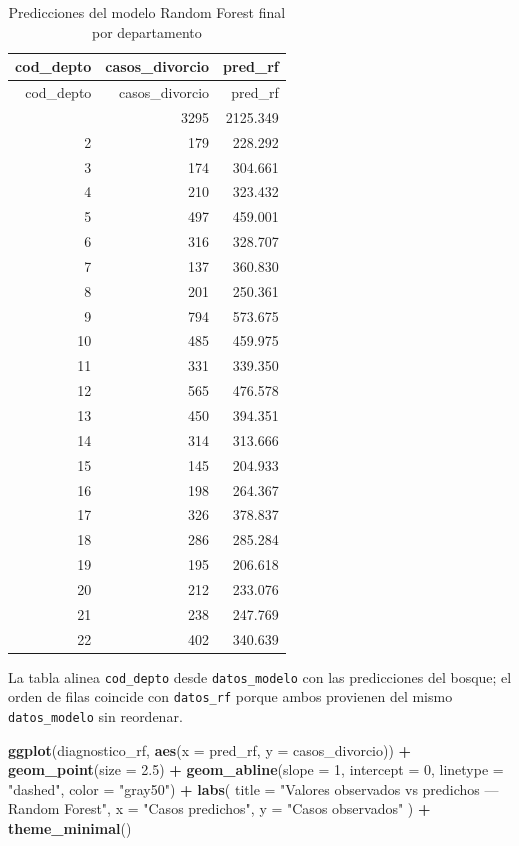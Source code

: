 \documentclass[
]{article}
\newenvironment{Shaded}{\begin{snugshade}}{\end{snugshade}}
\newcommand{\AttributeTok}[1]{\textcolor[rgb]{0.13,0.29,0.53}{#1}}
\newcommand{\DecValTok}[1]{\textcolor[rgb]{0.00,0.00,0.81}{#1}}
\newcommand{\FloatTok}[1]{\textcolor[rgb]{0.00,0.00,0.81}{#1}}
\newcommand{\FunctionTok}[1]{\textcolor[rgb]{0.13,0.29,0.53}{\textbf{#1}}}
\newcommand{\NormalTok}[1]{#1}
\newcommand{\SpecialCharTok}[1]{\textcolor[rgb]{0.81,0.36,0.00}{\textbf{#1}}}
\newcommand{\StringTok}[1]{\textcolor[rgb]{0.31,0.60,0.02}{#1}}
\begin{document}
\begin{longtable}[]{@{}rrr@{}}
\caption{Predicciones del modelo Random Forest final por
departamento}\tabularnewline
\toprule\noalign{}
cod\_depto & casos\_divorcio & pred\_rf \\
\midrule\noalign{}
\endfirsthead
\toprule\noalign{}
cod\_depto & casos\_divorcio & pred\_rf \\
\midrule\noalign{}
\endhead
\bottomrule\noalign{}
\endlastfoot
1 & 3295 & 2125.349 \\
2 & 179 & 228.292 \\
3 & 174 & 304.661 \\
4 & 210 & 323.432 \\
5 & 497 & 459.001 \\
6 & 316 & 328.707 \\
7 & 137 & 360.830 \\
8 & 201 & 250.361 \\
9 & 794 & 573.675 \\
10 & 485 & 459.975 \\
11 & 331 & 339.350 \\
12 & 565 & 476.578 \\
13 & 450 & 394.351 \\
14 & 314 & 313.666 \\
15 & 145 & 204.933 \\
16 & 198 & 264.367 \\
17 & 326 & 378.837 \\
18 & 286 & 285.284 \\
19 & 195 & 206.618 \\
20 & 212 & 233.076 \\
21 & 238 & 247.769 \\
22 & 402 & 340.639 \\
\end{longtable}

La tabla alinea \texttt{cod\_depto} desde \texttt{datos\_modelo} con las
predicciones del bosque; el orden de filas coincide con
\texttt{datos\_rf} porque ambos provienen del mismo
\texttt{datos\_modelo} sin reordenar.

\begin{Shaded}
\begin{Highlighting}[]
\FunctionTok{ggplot}\NormalTok{(diagnostico\_rf, }\FunctionTok{aes}\NormalTok{(}\AttributeTok{x =}\NormalTok{ pred\_rf, }\AttributeTok{y =}\NormalTok{ casos\_divorcio)) }\SpecialCharTok{+}
  \FunctionTok{geom\_point}\NormalTok{(}\AttributeTok{size =} \FloatTok{2.5}\NormalTok{) }\SpecialCharTok{+}
  \FunctionTok{geom\_abline}\NormalTok{(}\AttributeTok{slope =} \DecValTok{1}\NormalTok{, }\AttributeTok{intercept =} \DecValTok{0}\NormalTok{, }\AttributeTok{linetype =} \StringTok{"dashed"}\NormalTok{, }\AttributeTok{color =} \StringTok{"gray50"}\NormalTok{) }\SpecialCharTok{+}
  \FunctionTok{labs}\NormalTok{(}
    \AttributeTok{title =} \StringTok{"Valores observados vs predichos — Random Forest"}\NormalTok{,}
    \AttributeTok{x     =} \StringTok{"Casos predichos"}\NormalTok{,}
    \AttributeTok{y     =} \StringTok{"Casos observados"}
\NormalTok{  ) }\SpecialCharTok{+}
  \FunctionTok{theme\_minimal}\NormalTok{()}
\end{Highlighting}
\end{Shaded}
\end{document}
